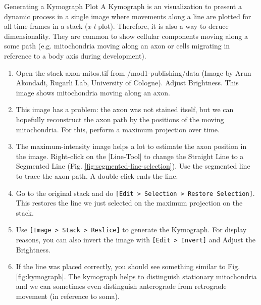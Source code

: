 \begin{taskbox}{Generating a Kymograph Plot}
A Kymograph is an visualization to present a dynamic process in a single image where movements along a line are plotted for all time-frames in a stack (\emph{x-t} plot). Therefore, it is also a way to deruce dimensionality. They are common to show cellular components moving along a some path (e.g. mitochondria moving along an axon or cells migrating in reference to a body axis during development).

\begin{enumerate}
	\item Open the stack axon-mitos.tif from /mod1-publishing/data (Image by Arun Akondadi, Rugarli Lab, University of Cologne). Adjust Brightness. This image shows mitochondria moving along an axon.
	\item This image has a problem: the axon was not stained itself, but we can hopefully reconstruct the axon path by the positions of the moving mitochondria. For this, perform a maximum projection over time.
	\item The maximum-intensity image helps a lot to estimate the axon position in the image. Right-click on the [Line-Tool] to change the Straight Line to a Segmented Line (Fig. \ref{fig:segmented-line-selection}). Use the segmented line to trace the axon path. A double-click ends the line.	
	
	\begin{minipage}[t]{\linewidth}
		\begin{center}
		\medskip
		\label{fig:segmented-line-selection}
		\end{center}
	\end{minipage}
	
	\item Go to the original stack and do \texttt{[Edit > Selection > Restore Selection]}. This restores the line we just selected on the maximum projection on the stack.
	\item Use \texttt{[Image > Stack > Reslice]} to generate the Kymograph. For display reasons, you can also invert the image with \texttt{[Edit > Invert]} and Adjust the Brightness.
	\item If the line was placed correctly, you should see something similar to Fig. \ref{fig:kymograph}. The kymograph helps to distinguish stationary mitochondria and we can sometimes even distinguish anterograde from retrograde movement (in reference to soma).	
	

\end{enumerate}
\end{taskbox}
